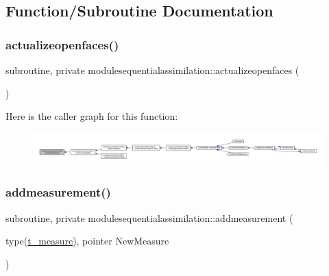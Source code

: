 \subsection{Function/\+Subroutine Documentation}
\mbox{\label{namespacemodulesequentialassimilation_ad6321e8248e2b795443ddc551cbc9446}} 
\subsubsection{\texorpdfstring{actualizeopenfaces()}{actualizeopenfaces()}}
{\footnotesize\ttfamily subroutine, private modulesequentialassimilation\+::actualizeopenfaces (\begin{DoxyParamCaption}{ }\end{DoxyParamCaption})\hspace{0.3cm}{\ttfamily [private]}}

Here is the caller graph for this function\+:\nopagebreak
\begin{figure}[H]
\begin{center}
\leavevmode
\includegraphics[width=350pt]{namespacemodulesequentialassimilation_ad6321e8248e2b795443ddc551cbc9446_icgraph}
\end{center}
\end{figure}
\mbox{\label{namespacemodulesequentialassimilation_a4263d5378b1943e8de2e1465b38720e8}} 
\subsubsection{\texorpdfstring{addmeasurement()}{addmeasurement()}}
{\footnotesize\ttfamily subroutine, private modulesequentialassimilation\+::addmeasurement (\begin{DoxyParamCaption}\item[{type(\mbox{\hyperlink{structmodulesequentialassimilation_1_1t__measure}{t\+\_\+measure}}), pointer}]{New\+Measure }\end{DoxyParamCaption})\hspace{0.3cm}{\ttfamily [private]}}

